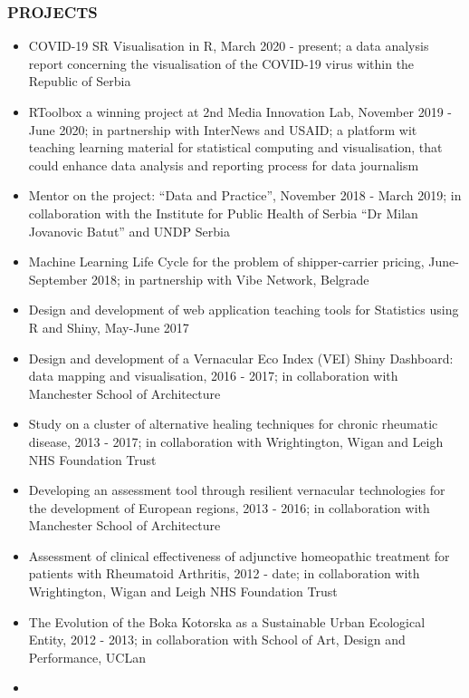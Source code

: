 \documentclass[
]{article}
\begin{document}
\hypertarget{projects}{%
\subsubsection{PROJECTS}\label{projects}}

\begin{itemize}
\item
  COVID-19 SR Visualisation in R, March 2020 - present; a data analysis
  report concerning the visualisation of the COVID-19 virus within the
  Republic of Serbia
\item
  RToolbox a winning project at 2nd Media Innovation Lab, November 2019
  - June 2020; in partnership with InterNews and USAID; a platform wit
  teaching learning material for statistical computing and
  visualisation, that could enhance data analysis and reporting process
  for data journalism
\item
  Mentor on the project: ``Data and Practice'', November 2018 - March
  2019; in collaboration with the Institute for Public Health of Serbia
  ``Dr Milan Jovanovic Batut'' and UNDP Serbia
\item
  Machine Learning Life Cycle for the problem of shipper-carrier
  pricing, June-September 2018; in partnership with Vibe Network,
  Belgrade
\item
  Design and development of web application teaching tools for
  Statistics using R and Shiny, May-June 2017
\item
  Design and development of a Vernacular Eco Index (VEI) Shiny
  Dashboard: data mapping and visualisation, 2016 - 2017; in
  collaboration with Manchester School of Architecture
\item
  Study on a cluster of alternative healing techniques for chronic
  rheumatic disease, 2013 - 2017; in collaboration with Wrightington,
  Wigan and Leigh NHS Foundation Trust
\item
  Developing an assessment tool through resilient vernacular
  technologies for the development of European regions, 2013 - 2016; in
  collaboration with Manchester School of Architecture
\item
  Assessment of clinical effectiveness of adjunctive homeopathic
  treatment for patients with Rheumatoid Arthritis, 2012 - date; in
  collaboration with Wrightington, Wigan and Leigh NHS Foundation Trust
\item
  The Evolution of the Boka Kotorska as a Sustainable Urban Ecological
  Entity, 2012 - 2013; in collaboration with School of Art, Design and
  Performance, UCLan
\item

\end{itemize}
\end{document}
